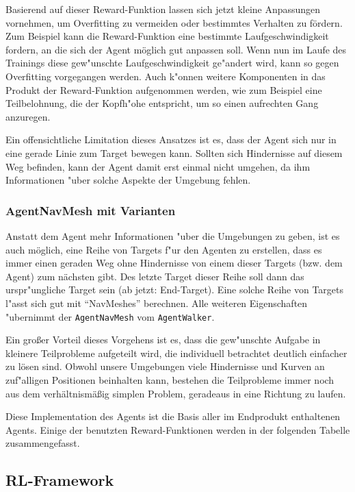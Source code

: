 Basierend auf dieser Reward-Funktion lassen sich jetzt kleine Anpassungen vornehmen, um Overfitting zu vermeiden oder bestimmtes Verhalten zu fördern. Zum Beispiel kann die Reward-Funktion eine bestimmte Laufgeschwindigkeit fordern, an die sich der Agent möglich gut anpassen soll. Wenn nun im Laufe des Trainings diese gew"unschte Laufgeschwindigkeit ge"andert wird, kann so gegen Overfitting vorgegangen werden. Auch k"onnen weitere Komponenten in das Produkt der Reward-Funktion aufgenommen werden, wie zum Beispiel eine Teilbelohnung, die der Kopfh"ohe entspricht, um so einen aufrechten Gang anzuregen.

Ein offensichtliche Limitation dieses Ansatzes ist es, dass der Agent sich nur in eine gerade Linie zum Target bewegen kann. Sollten sich Hindernisse auf diesem Weg befinden, kann der Agent damit erst einmal nicht umgehen, da ihm Informationen "uber solche Aspekte der Umgebung fehlen.

\subsubsection{AgentNavMesh mit Varianten}
\label{subsubsec:agentnavmesh}

Anstatt dem Agent mehr Informationen "uber die Umgebungen zu geben, ist es auch möglich, eine Reihe von Targets f"ur den Agenten zu erstellen, dass es immer einen geraden Weg ohne Hindernisse von einem dieser Targets (bzw. dem Agent) zum nächsten gibt. Des letzte Target dieser Reihe soll dann das urspr"ungliche Target sein (ab jetzt: End-Target). Eine solche Reihe von Targets l"asst sich gut mit \enquote{NavMeshes} berechnen. Alle weiteren Eigenschaften "ubernimmt der \texttt{AgentNavMesh} vom \texttt{AgentWalker}.

Ein großer Vorteil dieses Vorgehens ist es, dass die gew"unschte Aufgabe in kleinere Teilprobleme aufgeteilt wird, die individuell betrachtet deutlich einfacher zu lösen sind. Obwohl unsere Umgebungen viele Hindernisse und Kurven an zuf"alligen Positionen beinhalten kann, bestehen die Teilprobleme immer noch aus dem verhältnismäßig simplen Problem, geradeaus in eine Richtung zu laufen.

Diese Implementation des Agents ist die Basis aller im Endprodukt enthaltenen Agents. Einige der benutzten Reward-Funktionen werden in der folgenden Tabelle zusammengefasst.



\subsection{RL-Framework}

